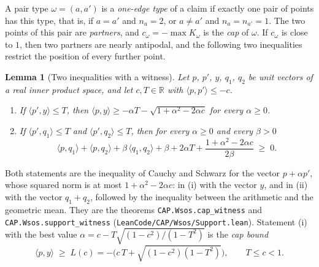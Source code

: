 \documentclass[reqno,a4paper,11pt]{amsart}
\numberwithin{equation}{section}
\newtheorem{lemma}[theorem]{Lemma}
\def\R{{\mathbb R}}
\newcommand{\lean}[1]{\texttt{#1}}
\newcommand{\file}[1]{\nolinkurl{#1}}
\begin{document}
A pair type $\omega = (a, a')$ is a \emph{one-edge type} of a claim if exactly one pair of points has this type, that is, if $a = a'$ and $n_a = 2$, or $a \neq a'$ and $n_a = n_{a'} = 1$. The two points of this pair are \emph{partners}, and $c_\omega = - \max K_\omega$ is the \emph{cap} of $\omega$. If $c_\omega$ is close to $1$, then two partners are nearly antipodal, and the following two inequalities restrict the position of every further point.

\begin{lemma}[Two inequalities with a witness]\label{lma:witness}
Let $p$, $p'$, $y$, $q_1$, $q_2$ be unit vectors of a real inner product space, and let $c, T \in \R$ with $\langle p, p' \rangle \leq -c$.
\begin{enumerate}
    \item[(i)] If $\langle p', y \rangle \leq T$, then $\langle p, y \rangle \geq -\alpha T - \sqrt{1 + \alpha^2 - 2 \alpha c}$ for every $\alpha \geq 0$.
    \item[(ii)] If $\langle p', q_1 \rangle \leq T$ and $\langle p', q_2 \rangle \leq T$, then for every $\alpha \geq 0$ and every $\beta > 0$
    $$
    \langle p, q_1 \rangle + \langle p, q_2 \rangle + \beta \, \langle q_1, q_2 \rangle + \beta + 2 \alpha T + \frac{1 + \alpha^2 - 2 \alpha c}{2 \beta} \;\geq\; 0 .
    $$
\end{enumerate}
\end{lemma}

Both statements are the inequality of Cauchy and Schwarz for the vector $p + \alpha p'$, whose squared norm is at most $1 + \alpha^2 - 2 \alpha c$: in (i) with the vector $y$, and in (ii) with the vector $q_1 + q_2$, followed by the inequality between the arithmetic and the geometric mean. They are the theorems \lean{CAP.Wsos.cap\_witness} and \lean{CAP.Wsos.support\_witness} (\file{LeanCode/CAP/Wsos/Support.lean}). Statement (i) with the best value $\alpha = c - T \sqrt{(1-c^2)/(1-T^2)}$ is the \emph{cap bound}
\begin{equation}\label{eq:capbound}
\langle p, y \rangle \;\geq\; L(c) = -\Big( c \, T + \sqrt{(1-c^2)(1-T^2)} \Big), \qquad T \leq c < 1 .
\end{equation}
\end{document}

